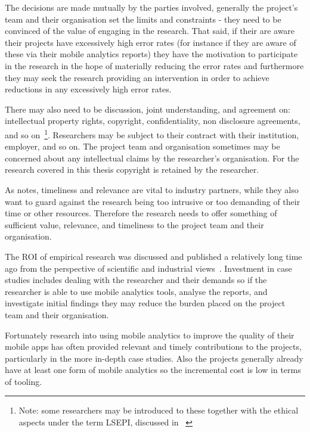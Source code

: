 The decisions are made mutually by the parties involved, generally the project's team and their organisation set the limits and constraints - they need to be convinced of the value of engaging in the research. That said, if their are aware their projects have excessively high error rates (for instance if they are aware of these via their mobile analytics reports) they have the motivation to participate in the research in the hope of materially reducing the error rates and furthermore they may seek the research providing an intervention in order to achieve reductions in any excessively high error rates. 

There may also need to be discussion, joint understanding, and agreement on: intellectual property rights, copyright, confidentiality, non disclosure agreements, and so on~\footnote{Note: some researchers may be introduced to these together with the ethical aspects under the term LSEPI, discussed in ~\citet{brooke2018__becoming_professional_a_university_perspective}}. Researchers may be subject to their contract with their institution, employer, and so on. The project team and organisation sometimes may be concerned about any intellectual claims by the researcher's organisation. For the research covered in this thesis copyright is retained by the researcher.

As \citet[p.324]{barroca_2018_bridging_the_gap} notes, timeliness and relevance are vital to industry partners, while they also want to guard against the research being too intrusive or too demanding of their time or other resources. Therefore the research needs to offer something of sufficient value, relevance, and timeliness to the project team and their organisation. 

The ROI of empirical research was discussed and published a relatively long time ago from the perspective of scientific and industrial views~\citet[pp54-57]{prechelt_2007_optimizing_ROI_for_empirical_SE_studies}. Investment in case studies includes dealing with the researcher and their demands so if the researcher is able to use mobile analytics tools, analyse the reports, and investigate initial findings they may reduce the burden placed on the project team and their organisation.

Fortunately research into using mobile analytics to improve the quality of their mobile apps has often provided relevant and timely contributions to the projects, particularly in the more in-depth case studies. Also the projects generally already have at least one form of mobile analytics so the incremental cost is low in terms of tooling.
 
